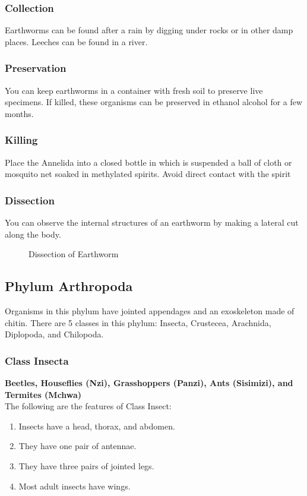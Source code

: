 \subsubsection{Collection}
Earthworms can be found after a rain by digging under rocks or in other damp places. Leeches can be found in a river.

\subsubsection{Preservation} 
You can keep earthworms in a container with fresh soil to preserve live specimens. If killed, these organisms can be preserved in ethanol alcohol for a few months. 

\subsubsection{Killing}
Place the Annelida into a closed bottle in which is suspended a ball of cloth or mosquito net soaked in methylated spirits. Avoid direct contact with the spirit

\subsubsection{Dissection}

You can observe the internal structures of an earthworm by making a lateral cut along the body.

\begin{figure}[h]
\begin{center}
\def\svgwidth{8cm}

\caption{Dissection of Earthworm}
\label{fig:worm-dissection}
\end{center}
\end{figure}

\subsection{Phylum Arthropoda}
Organisms in this phylum have jointed appendages and an exoskeleton made of chitin. There are 5 classes in this phylum: Insecta, Crustecea, Arachnida, Diplopoda, and Chilopoda.

\subsubsection{Class Insecta}
\textbf{Beetles, Houseflies (Nzi), Grasshoppers (Panzi), Ants (Sisimizi), and Termites (Mchwa)}\\
The following are the features of Class Insect:
\begin{enumerate}
\item{Insects have a head, thorax, and abdomen.}
\item{They have one pair of antennae.}
\item{They have three pairs of jointed legs.}
\item{Most adult insects have wings.}
\end{enumerate}

